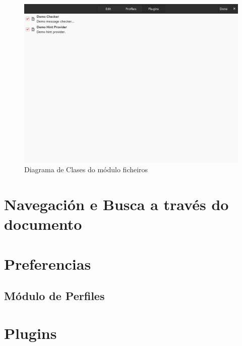 \begin{figure}[h!]
    \centering
    \includegraphics[width=\textwidth]{img/panel_preferencias_plugins.png}
    \caption{Diagrama de Clases do módulo ficheiros}
    \label{fig:dia_class:files}
\end{figure}


\section{Navegación e Busca a través do documento}

\section{Preferencias}

\subsection{Módulo de Perfiles}

\section{Plugins}

